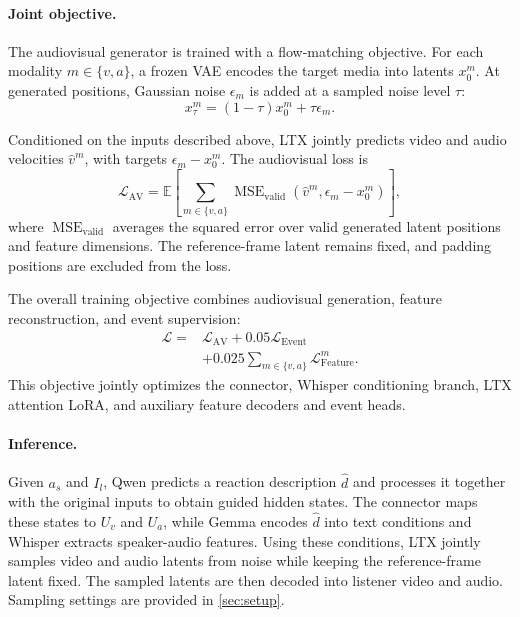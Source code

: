 \paragraph{Joint objective.}
The audiovisual generator is trained with a flow-matching
objective. For each modality $m\in\{v,a\}$, a frozen VAE
encodes the target media into latents $x_0^m$. At generated
positions, Gaussian noise $\epsilon_m$ is added at a sampled
noise level $\tau$:
\begin{equation}
    x_\tau^m=(1-\tau)x_0^m+\tau\epsilon_m.
    \label{eq:av-noising}
\end{equation}

Conditioned on the inputs described above, LTX jointly
predicts video and audio velocities $\widehat v^m$,
with targets $\epsilon_m-x_0^m$. The audiovisual loss is
\begin{equation}
    \mathcal L_{\mathrm{AV}}
    =
    \mathbb E\!\left[
    \sum_{m\in\{v,a\}}
    \operatorname{MSE}_{\mathrm{valid}}
    \left(\widehat v^m,\epsilon_m-x_0^m\right)
    \right],
    \label{eq:av}
\end{equation}
where $\operatorname{MSE}_{\mathrm{valid}}$ averages the
squared error over valid generated latent positions and
feature dimensions. The reference-frame latent remains
fixed, and padding positions are excluded from the loss.



The overall training objective combines audiovisual generation,
feature reconstruction, and event supervision:
\begin{equation}
\begin{aligned}
    \mathcal L ={}&
    \mathcal L_{\mathrm{AV}}
    +0.05\mathcal L_{\mathrm{Event}}\\
    &+0.025\sum_{m\in\{v,a\}}
    \mathcal L_{\mathrm{Feature}}^m.
\end{aligned}
\label{eq:total}
\end{equation}
This objective jointly optimizes the connector, Whisper
conditioning branch, LTX attention LoRA, and auxiliary
feature decoders and event heads.

\paragraph{Inference.}
Given $a_s$ and $I_l$, Qwen predicts a reaction description
$\hat d$ and processes it together with the original inputs
to obtain guided hidden states. The connector maps these
states to $U_v$ and $U_a$, while Gemma encodes $\hat d$
into text conditions and Whisper extracts speaker-audio
features. Using these conditions, LTX jointly samples video
and audio latents from noise while keeping the reference-frame
latent fixed. The sampled latents are then decoded into
listener video and audio. Sampling settings are provided
in \cref{sec:setup}.
